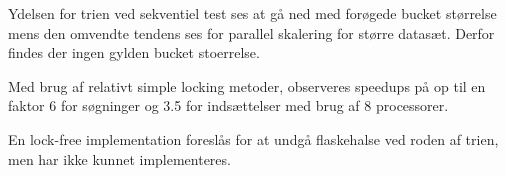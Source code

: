 Ydelsen for trien ved sekventiel test ses at gå ned med forøgede bucket størrelse
mens den omvendte tendens ses for parallel skalering for større datasæt. Derfor
findes der ingen gylden bucket stoerrelse.

Med brug af relativt simple locking metoder, observeres speedups på op til en
faktor 6 for søgninger og 3.5 for indsættelser med brug af 8 processorer.

En lock-free implementation foreslås for at undgå flaskehalse ved
roden af trien, men har ikke kunnet implementeres.

